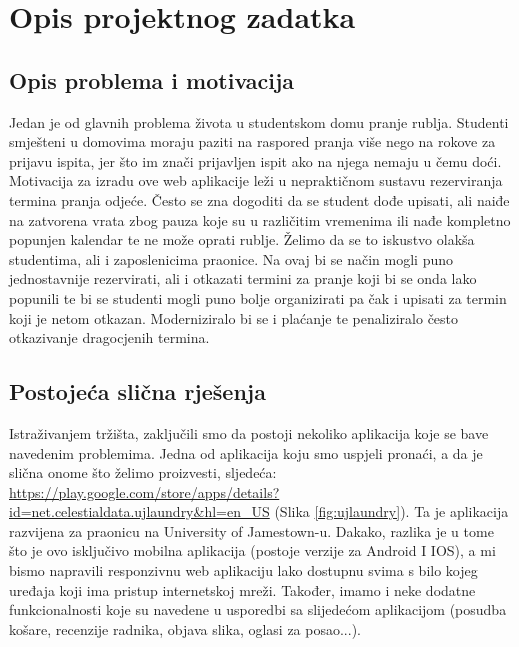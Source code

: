 \chapter{Opis projektnog zadatka}
		
		\section{Opis problema i motivacija}
		
			{Jedan je od glavnih problema života u studentskom domu pranje rublja. Studenti smješteni u domovima
			moraju paziti na raspored pranja više nego na rokove za prijavu ispita, jer što im znači prijavljen ispit ako
			na njega nemaju u čemu doći. Motivacija za izradu ove web aplikacije leži u nepraktičnom sustavu
			rezerviranja termina pranja odjeće. Često se zna dogoditi da se student dođe upisati, ali naiđe na
			zatvorena vrata zbog pauza koje su u različitim vremenima ili nađe kompletno popunjen kalendar te ne
			može oprati rublje. Želimo da se to iskustvo olakša studentima, ali i zaposlenicima praonice. Na ovaj bi se
			način mogli puno jednostavnije rezervirati, ali i otkazati termini za pranje koji bi se onda lako popunili te
			bi se studenti mogli puno bolje organizirati pa čak i upisati za termin koji je netom otkazan.
			Moderniziralo bi se i plaćanje te penaliziralo često otkazivanje dragocjenih termina.}
		
		\section{Postojeća slična rješenja}
		
			{Istraživanjem tržišta, zaključili smo da postoji nekoliko aplikacija koje se bave navedenim problemima.
			Jedna od aplikacija koju smo uspjeli pronaći, a da je slična onome što želimo proizvesti, sljedeća:
			\url{https://play.google.com/store/apps/details?id=net.celestialdata.ujlaundry&hl=en_US} (Slika  \ref{fig:ujlaundry}). Ta je aplikacija
			razvijena za praonicu na University of Jamestown-u. Dakako, razlika je u tome što je ovo isključivo
			mobilna aplikacija (postoje verzije za Android I IOS), a mi bismo napravili responzivnu web aplikaciju lako
			dostupnu svima s bilo kojeg uređaja koji ima pristup internetskoj mreži. Također, imamo i neke dodatne
			funkcionalnosti koje su navedene u usporedbi sa slijedećom aplikacijom (posudba košare, recenzije
			radnika, objava slika, oglasi za posao...).}
		
